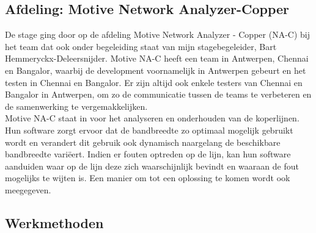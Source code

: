 \documentclass[10pt,a4paper]{article}
\begin{document}
\subsection{Afdeling: Motive Network Analyzer-Copper}
\label{afdeling}
De stage ging door op de afdeling Motive Network Analyzer - Copper (NA-C) bij het team dat ook onder begeleiding staat van mijn stagebegeleider, Bart Hemmeryckx-Deleersnijder. Motive NA-C heeft een team in Antwerpen, Chennai en Bangalor, waarbij de development voornamelijk in Antwerpen gebeurt en het testen in Chennai en Bangalor. Er zijn altijd ook enkele testers van Chennai en Bangalor in Antwerpen, om zo de communicatie tussen de teams te verbeteren en de samenwerking te vergemakkelijken.\\
Motive NA-C staat in voor het analyseren en onderhouden van de koperlijnen. Hun software zorgt ervoor dat de bandbreedte zo optimaal mogelijk gebruikt wordt en verandert dit gebruik ook dynamisch naargelang de beschikbare bandbreedte vari\"eert. Indien er fouten optreden op de lijn, kan hun software aanduiden waar op de lijn deze zich waarschijnlijk bevindt en waaraan de fout mogelijks te wijten is. Een manier om tot een oplossing te komen wordt ook meegegeven.
\subsection{Werkmethoden}
\label{methoden}
\end{document}
